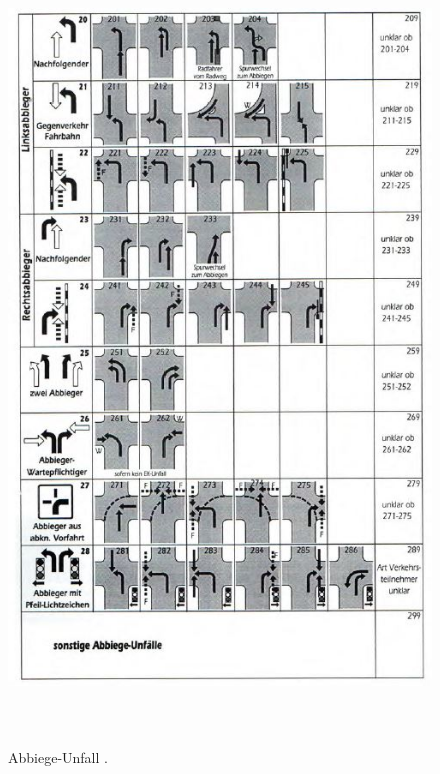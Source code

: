 \begin{savenotes}
	\begin{figure}[H]
		\centering
		\includegraphics[width=13cm,height=21cm]{figures/FT2}
		\caption[Abbiege-Unfall nach GDV]{Abbiege-Unfall \parencite[S. 11]{GesamtverbandderDeutschenVersicherungswirtschafte.V..2016}. }\label{fig:FT2}
	\end{figure}
\end{savenotes}

